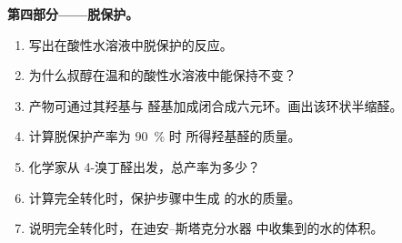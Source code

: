 \begin{problem}
\medskip
\noindent\textbf{第四部分——脱保护。}
\begin{enumerate}[resume]
  \item 写出在酸性水溶液中脱保护的反应。
  \item 为什么叔醇在温和的酸性水溶液中能保持不变？
  \item 产物可通过其羟基与
        醛基加成闭合成六元环。画出该环状半缩醛。
  \item 计算脱保护产率为 \qty{90}{\percent} 时
        所得羟基醛的质量。
  \item 化学家从 4-溴丁醛出发，总产率为多少？
  \item 计算完全转化时，保护步骤中生成
        的水的质量。
  \item 说明完全转化时，在迪安–斯塔克分水器
        中收集到的水的体积。
\end{enumerate}
\end{problem}
